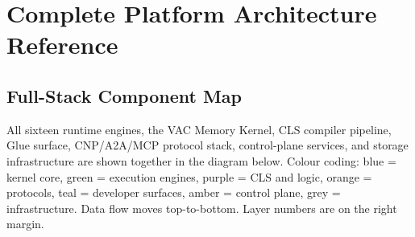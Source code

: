 \chapter{Complete Platform Architecture Reference}
\label{ch:complete-arch}

\section{Full-Stack Component Map}

All sixteen runtime engines, the VAC Memory Kernel, CLS compiler pipeline,
Glue surface, CNP/A2A/MCP protocol stack, control-plane services, and storage
infrastructure are shown together in the diagram below. Colour coding: blue
= kernel core, green = execution engines, purple = CLS and logic, orange =
protocols, teal = developer surfaces, amber = control plane, grey =
infrastructure. Data flow moves top-to-bottom. Layer numbers are on the right
margin.

